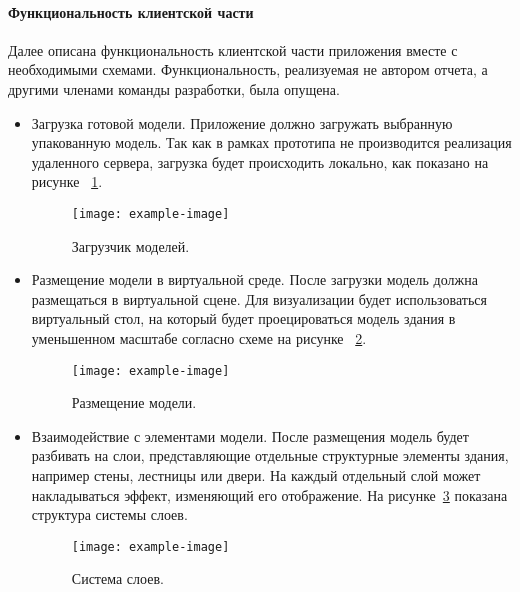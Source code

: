 ﻿\paragraph{Функциональность клиентской части}

Далее описана функциональность клиентской части приложения
вместе с необходимыми схемами.
Функциональность, реализуемая не автором отчета,
а другими членами команды разработки, была опущена.

\begin{itemize}
    \item {
        Загрузка готовой модели.
        Приложение должно загружать выбранную упакованную модель.
        Так как в рамках прототипа не производится реализация удаленного сервера,
        загрузка будет происходить локально, как показано на рисунке~%
        \ref{figure:CModelLoader}.

        \begin{figure}[ht]
            \centering
            \texttt{[image: example-image]}
            \caption{Загрузчик моделей.}
            \label{figure:CModelLoader}
        \end{figure}

    } 
    \item {
        Размещение модели в виртуальной среде.
        После загрузки модель должна размещаться в виртуальной сцене.
        Для визуализации будет использоваться виртуальный стол,
        на который будет проецироваться модель здания
        в уменьшенном масштабе согласно схеме на рисунке~%
        \ref{figure:CStand}.

        \begin{figure}[ht]
            \centering
            \texttt{[image: example-image]}
            \caption{Размещение модели.}
            \label{figure:CStand}
        \end{figure}

    } 
    \item {
        Взаимодействие с элементами модели.
        После размещения модель будет разбивать на слои,
        представляющие отдельные структурные элементы здания,
        например стены, лестницы или двери.
        На каждый отдельный слой может накладываться эффект,
        изменяющий его отображение.
        На рисунке~\ref{figure:CLayers} показана
        структура системы слоев.

        \begin{figure}[ht]
            \centering
            \texttt{[image: example-image]}
            \caption{Система слоев.}
            \label{figure:CLayers}
        \end{figure}

    } 
\end{itemize}

